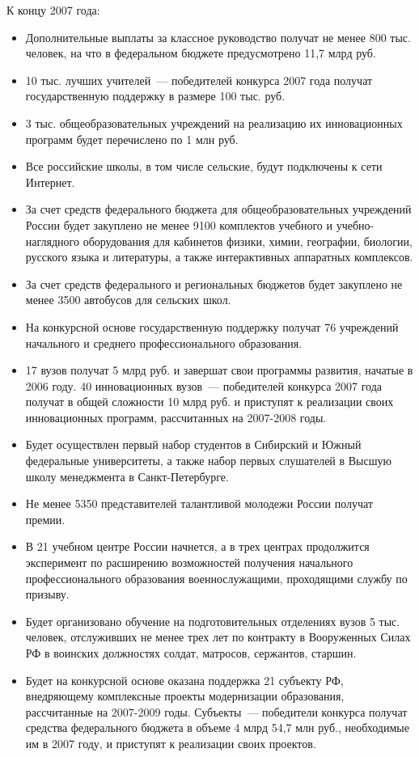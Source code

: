 \documentclass[article, 12pt, russian, oneside]{ncc}
\begin{document}
К концу 2007 года:

\begin{itemize}
\item Дополнительные выплаты за классное руководство получат не менее 800 тыс. человек, на что в федеральном бюджете предусмотрено 11,7 млрд руб.
\item 10 тыс. лучших учителей~--- победителей конкурса 2007 года получат государственную поддержку в размере 100 тыс. руб.
\item 3 тыс. общеобразовательных учреждений на реализацию их инновационных программ будет перечислено по 1 млн руб.
\item Все российские школы, в том числе сельские, будут подключены к сети Интернет.
\item За счет средств федерального бюджета для общеобразовательных учреждений России будет закуплено не менее 9100 комплектов учебного и учебно-наглядного оборудования для кабинетов физики, химии, географии, биологии, русского языка и литературы, а также интерактивных аппаратных комплексов.
\item За счет средств федерального и региональных бюджетов будет закуплено не менее 3500 автобусов для сельских школ.
\item На конкурсной основе государственную поддержку получат 76 учреждений начального и среднего профессионального образования.
\item 17 вузов получат 5 млрд руб. и завершат свои программы развития, начатые в 2006 году. 40 инновационных вузов~--- победителей конкурса 2007 года получат в общей сложности 10 млрд руб. и приступят к реализации своих инновационных программ, рассчитанных на 2007-2008 годы.
\item Будет осуществлен первый набор студентов в Сибирский и Южный федеральные университеты, а также набор первых слушателей в Высшую школу менеджмента в Санкт-Петербурге.
\item Не менее 5350 представителей талантливой молодежи России получат премии.
\item В 21 учебном центре России начнется, а в трех центрах продолжится эксперимент по расширению возможностей получения начального профессионального образования военнослужащими, проходящими службу по призыву.
\item Будет организовано обучение на подготовительных отделениях вузов 5 тыс. человек, отслуживших не менее трех лет по контракту в Вооруженных Силах РФ в воинских должностях солдат, матросов, сержантов, старшин.
\item Будет на конкурсной основе оказана поддержка 21 субъекту РФ, внедряющему комплексные проекты модернизации образования, рассчитанные на 2007-2009 годы. Субъекты~--- победители конкурса получат средства федерального бюджета в объеме 4 млрд 54,7 млн руб., необходимые им в 2007 году, и приступят к реализации своих проектов.
\end{itemize}
\end{document}
